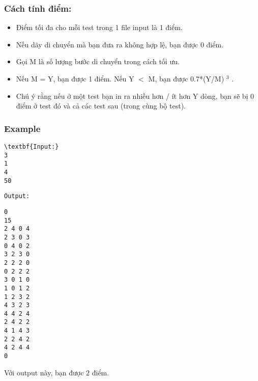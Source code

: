 \subsubsection{   Cách tính điểm:  }
\begin{itemize}
	\item     Điểm tối đa cho mỗi test trong 1 file input là 1 điểm.   
	\item     Nếu dãy di chuyển mà bạn đưa ra không hợp lệ, bạn được 0 điểm.   
	\item     Gọi M là số lượng bước di chuyển trong cách tối ưu.   
	\item     Nếu M = Y, bạn được 1 điểm. Nếu Y $<$ M, bạn được 0.7*(Y/M)    $^     3    $    .   
	\item     Chú ý rằng nếu ở một test bạn in ra nhiều hơn / ít hơn Y dòng, bạn sẽ bị 0 điểm ở test đó và cả các test sau (trong cùng bộ test).   
\end{itemize}

\subsubsection{   Example  }
\begin{verbatim}
\textbf{Input:}
3
1
4
50
\end{verbatim}
\begin{verbatim}
Output:\end{verbatim}
\begin{verbatim}
0
15
2 4 0 4
2 3 0 3
0 4 0 2
3 2 3 0
2 2 2 0
0 2 2 2
3 0 1 0
1 0 1 2
1 2 3 2
4 3 2 3
4 4 2 4
2 4 2 2
4 1 4 3
2 2 4 2
4 2 4 4
0
\end{verbatim}

   Với output này, bạn được 2 điểm.  